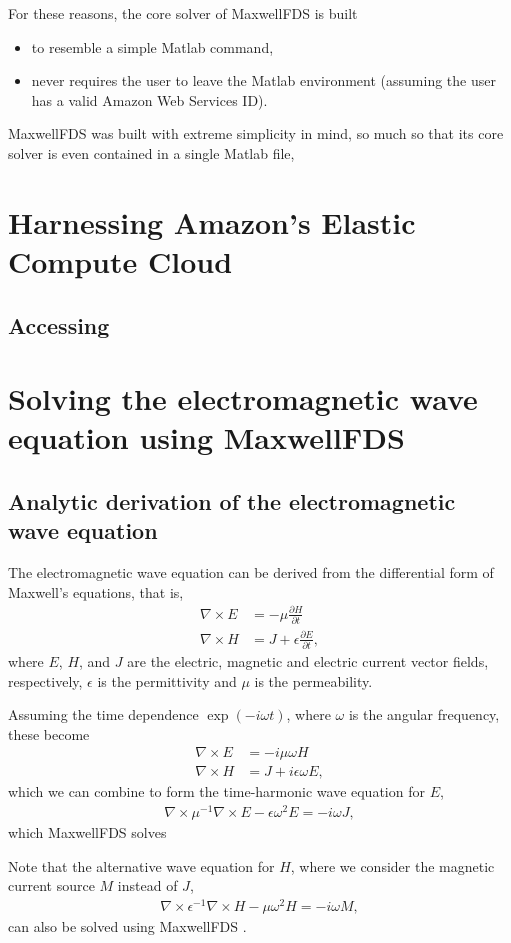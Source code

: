 \documentclass{article}
\newcommand{\E}[2]{\begin{align}#2\label{eq:#1}\end{align}}
\newcommand{\EE}[2]{\begin{subequations}\begin{align}#2\end{align}\label{eq:#1}\end{subequations}}
\newcommand{\curl}{\nabla\times}
\newcommand{\MaxwellFDS}{MaxwellFDS }
\newcommand{\BI}{\begin{itemize}\item}
\newcommand{\EI}{\end{itemize}}
\newcommand{\I}{\item}
\begin{document}
For these reasons, the core solver of \MaxwellFDS is built
    \BI to resemble a simple Matlab command,
    \I  never requires the user to leave the Matlab environment
            (assuming the user has a valid Amazon Web Services ID). \EI

\MaxwellFDS was built with extreme simplicity in mind,
    so much so that its core solver is even contained in a single Matlab file,

\section{Harnessing Amazon's Elastic Compute Cloud} 
\subsection{Accessing }

\section{Solving the electromagnetic wave equation using \MaxwellFDS}
\subsection{Analytic derivation of the electromagnetic wave equation}
The electromagnetic wave equation can be derived from 
    the differential form of Maxwell's equations, that is,
\EE {maxwell diff}
    {\curl E &= - \mu \frac{\partial H}{\partial t} \\
    \curl H &= J + \epsilon \frac{\partial E}{\partial t}, }
    where $E$, $H$, and $J$ are 
    the electric, magnetic and electric current
    vector fields, respectively,
    $\epsilon$ is the permittivity
    and $\mu$ is the permeability.

Assuming the time dependence $\exp(-i \omega t)$, 
    where $\omega$ is the angular frequency,
    these become
\EE {maxwell harmonic}
    {\curl E &= - i \mu \omega H \\
    \curl H &= J + i \epsilon \omega E,}
    which we can combine to form the time-harmonic wave equation for $E$,
    \E{maxwell wave E}
    {\curl \mu^{-1} \curl E - \epsilon \omega^2 E = -i \omega J,}
    which \MaxwellFDS solves

Note that the alternative wave equation for $H$,
    where we consider the magnetic current source $M$
    instead of $J$,
\E  {maxwell wave H}
    {\curl \epsilon^{-1} \curl H - \mu \omega^2 H = -i \omega M,}
    can also be solved using \MaxwellFDS.
\end{document}
